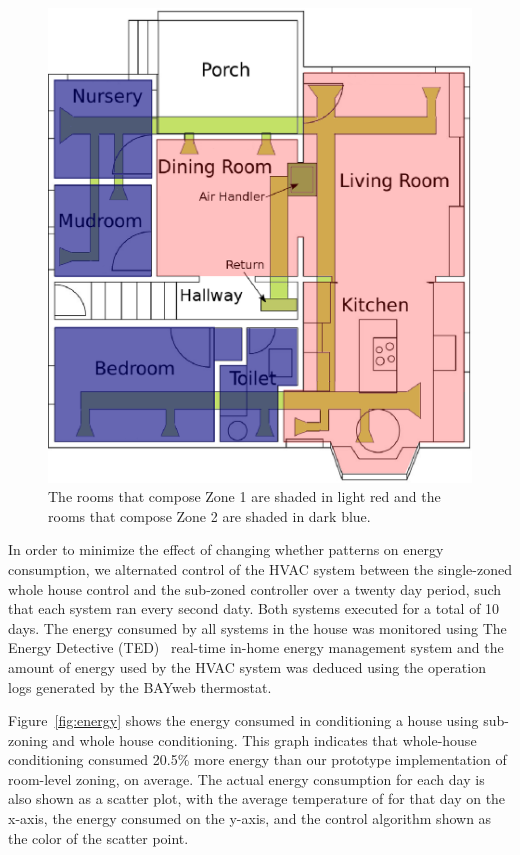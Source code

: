 \begin{figure}[ht]
  \centering
  \includegraphics[width=0.6\columnwidth]{fig/floorplan-mechanicalZoned.eps}
  \caption[Static Zones]{The rooms that
    compose Zone 1 are shaded in light red and the rooms that compose Zone 2 are
    shaded in dark blue.}
  \label{fig:floorplan}
\end{figure}

In order to minimize the effect of changing whether patterns on energy
consumption, we alternated control of the HVAC system between the single-zoned
whole house control and the sub-zoned controller over a twenty day period, such
that each system ran every second daty.  Both systems executed for a total of 10
days. The energy consumed by all systems in the house was monitored using The
Energy Detective (TED)~\cite{Energy} real-time in-home energy management system
and the amount of energy used by the HVAC system was deduced using the operation
logs generated by the BAYweb thermostat.

Figure~\ref{fig:energy} shows the energy consumed in conditioning a house using
sub-zoning and whole house conditioning. This graph indicates that whole-house
conditioning consumed 20.5\% more energy than our prototype implementation of
room-level zoning, on average.  The actual energy consumption for each day is
also shown as a scatter plot, with the average temperature of for that day on
the x-axis, the energy consumed on the y-axis, and the control algorithm shown
as the color of the scatter point.


